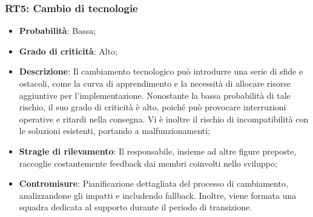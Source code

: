 \subsubsection{RT5: Cambio di tecnologie}
\begin{itemize}
    \item \textbf{Probabilità}: Bassa;
    \item \textbf{Grado di criticità}: Alto;
    \item \textbf{Descrizione}: Il cambiamento tecnologico può introdurre una serie di sfide e ostacoli, come la curva di apprendimento e la necessità di allocare risorse aggiuntive per l'implementazione. Nonostante la bassa probabilità di tale rischio, il suo grado di criticità è alto, poiché può provocare interruzioni operative e ritardi nella consegna. Vi è inoltre il rischio di incompatibilità con le soluzioni esistenti, portando a malfunzionamenti;
    \item \textbf{Stragie di rilevamento}: Il responsabile, insieme ad altre figure preposte, raccoglie costantemente feedback dai membri coinvolti nello sviluppo;
    \item \textbf{Contromisure}: Pianificazione dettagliata del processo di cambiamento, analizzandone gli impatti e includendo fallback. Inoltre, viene formata una squadra dedicata al supporto durante il periodo di transizione.
\end{itemize}
